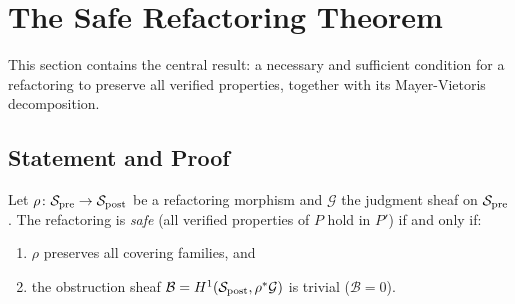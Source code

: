 \documentclass[11pt]{article}
\newcommand{\SitePre}{\Site_{\mathrm{pre}}}
\newcommand{\SitePost}{\Site_{\mathrm{post}}}
\newcommand{\RefactorMorph}{\rho}
\newcommand{\ObstructionSheaf}{\mathcal{B}}
\begin{document}
\section{The Safe Refactoring Theorem}\label{sec:safety-theorem}

This section contains the central result: a necessary and sufficient
condition for a refactoring to preserve all verified properties, together
with its Mayer-Vietoris decomposition.

\subsection{Statement and Proof}\label{ssec:safe-statement}

\begin{theorem}\label{thm:safe-refactoring}
Let $\RefactorMorph \colon \SitePre \to \SitePost$ be a refactoring
morphism and $\mathcal{G}$ the judgment sheaf on $\SitePre$.  The
refactoring is \emph{safe} (all verified properties of $P$ hold in
$P'$) if and only if:
\begin{enumerate}[noitemsep]
  \item $\RefactorMorph$ preserves all covering families, and
  \item the obstruction sheaf
        $\ObstructionSheaf = \Hcoh{1}(\SitePost,
        \RefactorMorph^{*}\mathcal{G})$ is trivial
        ($\ObstructionSheaf = 0$).
\end{enumerate}
\end{theorem}
\end{document}
